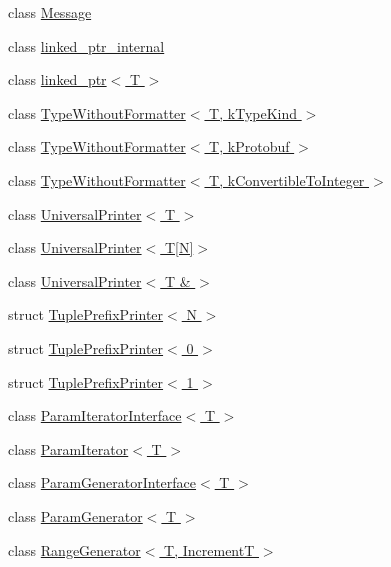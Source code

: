 \begin{DoxyCompactItemize}
class \hyperlink{classtesting_1_1Message}{\-Message}
\item 
class \hyperlink{classtesting_1_1internal_1_1linked__ptr__internal}{linked\-\_\-ptr\-\_\-internal}
\item 
class \hyperlink{classtesting_1_1internal_1_1linked__ptr}{linked\-\_\-ptr$<$ T $>$}
\item 
class \hyperlink{classtesting_1_1internal2_1_1TypeWithoutFormatter}{\-Type\-Without\-Formatter$<$ T, k\-Type\-Kind $>$}
\item 
class \hyperlink{classtesting_1_1internal2_1_1TypeWithoutFormatter_3_01T_00_01kProtobuf_01_4}{\-Type\-Without\-Formatter$<$ T, k\-Protobuf $>$}
\item 
class \hyperlink{classtesting_1_1internal2_1_1TypeWithoutFormatter_3_01T_00_01kConvertibleToInteger_01_4}{\-Type\-Without\-Formatter$<$ T, k\-Convertible\-To\-Integer $>$}
\item 
class \hyperlink{classtesting_1_1internal_1_1UniversalPrinter}{\-Universal\-Printer$<$ T $>$}
\item 
class \hyperlink{classtesting_1_1internal_1_1UniversalPrinter_3_01T[N]_4}{\-Universal\-Printer$<$ T\mbox{[}\-N\mbox{]}$>$}
\item 
class \hyperlink{classtesting_1_1internal_1_1UniversalPrinter_3_01T_01_6_01_4}{\-Universal\-Printer$<$ T \& $>$}
\item 
struct \hyperlink{structtesting_1_1internal_1_1TuplePrefixPrinter}{\-Tuple\-Prefix\-Printer$<$ N $>$}
\item 
struct \hyperlink{structtesting_1_1internal_1_1TuplePrefixPrinter_3_010_01_4}{\-Tuple\-Prefix\-Printer$<$ 0 $>$}
\item 
struct \hyperlink{structtesting_1_1internal_1_1TuplePrefixPrinter_3_011_01_4}{\-Tuple\-Prefix\-Printer$<$ 1 $>$}
\item 
class \hyperlink{classtesting_1_1internal_1_1ParamIteratorInterface}{\-Param\-Iterator\-Interface$<$ T $>$}
\item 
class \hyperlink{classtesting_1_1internal_1_1ParamIterator}{\-Param\-Iterator$<$ T $>$}
\item 
class \hyperlink{classtesting_1_1internal_1_1ParamGeneratorInterface}{\-Param\-Generator\-Interface$<$ T $>$}
\item 
class \hyperlink{classtesting_1_1internal_1_1ParamGenerator}{\-Param\-Generator$<$ T $>$}
\item 
class \hyperlink{classtesting_1_1internal_1_1RangeGenerator}{\-Range\-Generator$<$ T, Increment\-T $>$}
\item 

\end{DoxyCompactItemize}
